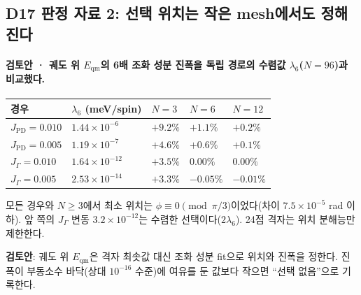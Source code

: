 \subsection{D17 판정 자료 2: 선택 위치는 작은 mesh에서도 정해진다}\label{state-selection-mesh}
\begingroup%
  \framesubtitle{검토안 · 궤도 위 $E_{\mathrm{qm}}$의 6배 조화 성분 진폭을 독립 경로의 수렴값 $\lambda_6$($N=96$)과 비교했다.}
  \small
  \begin{tabularx}{\textwidth}{@{}YP{2.7cm}P{1.6cm}P{1.6cm}P{1.6cm}@{}}
    \toprule
    경우 & $\lambda_6$ (meV/spin) & $N=3$ & $N=6$ & $N=12$ \\
    \midrule
    $J_{\mathrm{PD}}=0.010$ & $1.44\times10^{-6}$ & $+9.2\%$ & $+1.1\%$ & $+0.2\%$ \\
    $J_{\mathrm{PD}}=0.005$ & $1.19\times10^{-7}$ & $+4.6\%$ & $+0.6\%$ & $+0.1\%$ \\
    $J_\Gamma=0.010$ & $1.64\times10^{-12}$ & $+3.5\%$ & $0.00\%$ & $0.00\%$ \\
    $J_\Gamma=0.005$ & $2.53\times10^{-14}$ & $+3.3\%$ & $-0.05\%$ & $-0.01\%$ \\
    \bottomrule
  \end{tabularx}
  \par\medskip
  모든 경우와 $N\ge3$에서 최소 위치는 $\phi\equiv0\pmod{\pi/3}$이었다(차이 $7.5\times10^{-5}$ rad 이하).
  앞 쪽의 $J_\Gamma$ 변동 $3.2\times10^{-12}$는 수렴한 선택이다($2\lambda_6$). 24점 격자는 위치 분해능만 제한한다.
  \par\medskip
  \textbf{검토안}: 궤도 위 $E_{\mathrm{qm}}$은 격자 최솟값 대신 조화 성분 fit으로 위치와 진폭을 정한다.
  진폭이 부동소수 바닥(상대 $10^{-16}$ 수준)에 여유를 둔 값보다 작으면 ``선택 없음''으로 기록한다.
  \par\medskip
\endgroup


